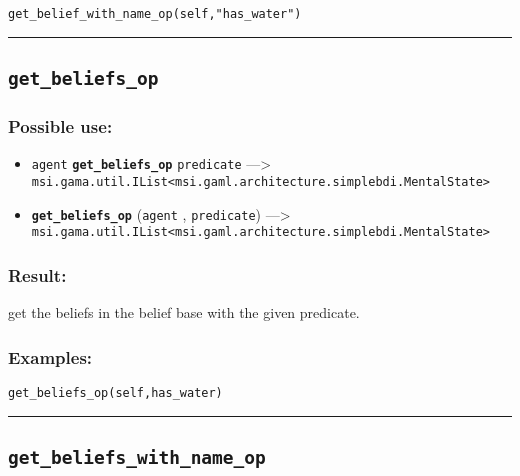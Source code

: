 \documentclass[]{book}
\providecommand{\tightlist}{%
  \setlength{\itemsep}{0pt}\setlength{\parskip}{0pt}}
\theoremstyle{definition}
\theoremstyle{definition}
\theoremstyle{definition}
\theoremstyle{remark}
\begin{document}
\begin{verbatim}
get_belief_with_name_op(self,"has_water") 
\end{verbatim}

\begin{center}\rule{0.5\linewidth}{\linethickness}\end{center}

\subsection{\texorpdfstring{\texttt{get\_beliefs\_op}}{get\_beliefs\_op}}\label{get_beliefs_op}

\subsubsection{Possible use:}\label{possible-use-199}

\begin{itemize}
\tightlist
\item
  \texttt{agent} \textbf{\texttt{get\_beliefs\_op}} \texttt{predicate}
  ---\textgreater{}
  \texttt{msi.gama.util.IList\textless{}msi.gaml.architecture.simplebdi.MentalState\textgreater{}}
\item
  \textbf{\texttt{get\_beliefs\_op}} (\texttt{agent} ,
  \texttt{predicate}) ---\textgreater{}
  \texttt{msi.gama.util.IList\textless{}msi.gaml.architecture.simplebdi.MentalState\textgreater{}}
\end{itemize}

\subsubsection{Result:}\label{result-193}

get the beliefs in the belief base with the given predicate.

\subsubsection{Examples:}\label{examples-146}

\begin{verbatim}
get_beliefs_op(self,has_water) 
\end{verbatim}

\begin{center}\rule{0.5\linewidth}{\linethickness}\end{center}

\subsection{\texorpdfstring{\texttt{get\_beliefs\_with\_name\_op}}{get\_beliefs\_with\_name\_op}}\label{get_beliefs_with_name_op}
\end{document}
